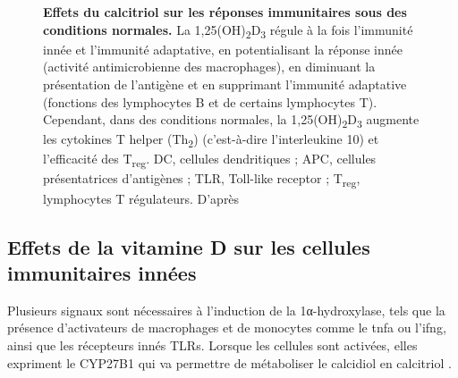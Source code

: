 \documentclass[
  a4paper,
  DIV=11,
  numbers=noendperiod,
  listof=totoc]{scrreprt}
\begin{document}
\begin{figure}


\caption[Effets du calcitriol sur les réponses immunitaires sous des
conditions normales.]{\label{fig-vd-immune-effect}\textbf{Effets du
calcitriol sur les réponses immunitaires sous des conditions normales.}
La 1,25(OH)\textsubscript{2}D\textsubscript{3} régule à la fois
l'immunité innée et l'immunité adaptative, en potentialisant la réponse
innée (activité antimicrobienne des macrophages), en diminuant la
présentation de l'antigène et en supprimant l'immunité adaptative
(fonctions des lymphocytes B et de certains lymphocytes T). Cependant,
dans des conditions normales, la
1,25(OH)\textsubscript{2}D\textsubscript{3} augmente les cytokines T
helper (Th\textsubscript{2}) (c'est-à-dire l'interleukine 10) et
l'efficacité des T\textsubscript{reg}. DC, cellules dendritiques ; APC,
cellules présentatrices d'antigènes ; TLR, Toll-like receptor ;
T\textsubscript{reg}, lymphocytes T régulateurs. D'après
\textcite{Cutolo.2014}}

\end{figure}%

\subsection{Effets de la vitamine D sur les cellules immunitaires
innées}\label{effets-de-la-vitamine-d-sur-les-cellules-immunitaires-innuxe9es}

Plusieurs signaux sont nécessaires à l'induction de la 1α-hydroxylase,
tels que la présence d'activateurs de macrophages et de monocytes comme
le \ac{tnfa} ou l'\ac{ifng}, ainsi que les récepteurs innés \acp{TLR}.
Lorsque les cellules sont activées, elles expriment le \ac{CYP27B1} qui
va permettre de métaboliser le calcidiol en calcitriol
\autocite{Liu.2006,Charoenngam.2020}.
\end{document}
